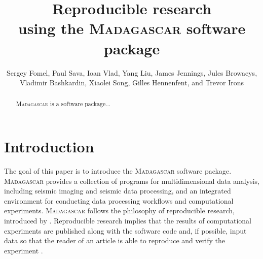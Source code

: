 \title{Reproducible research \\ using the \textsc{Madagascar} software package}

\renewcommand{\thefootnote}{\fnsymbol{footnote}} 

\author{Sergey Fomel\footnotemark[1], Paul Sava\footnotemark[2], Ioan Vlad\footnotemark[3], Yang Liu\footnotemark[1], James Jennings\footnotemark[4], Jules Browaeys\footnotemark[5], Vladimir Bashkardin\footnotemark[1], Xiaolei Song\footnotemark[1], Gilles Hennenfent\footnotemark[6], and Trevor Irons\footnotemark[2]}


\address{
\footnotemark[1]Bureau of Economic Geology, \\
John A. and Katherine G. Jackson School of Geosciences \\ The
University of Texas at Austin \\ University Station, Box X \\ Austin,
TX 78713-8972 \\
\footnotemark[2] Department of Geophysics \\
Colorado School of Mines \\
Golden, CO 80401 \\
\footnotemark[3] Statoil \\
\footnotemark[4] Shell \\
\footnotemark[5] Total \\
\footnotemark[6] Chevron}


\maketitle

\begin{abstract}
  \textsc{Madagascar} is a software package...
\end{abstract}

\section{Introduction}

The goal of this paper is to introduce the \textsc{Madagascar}
software package. \textsc{Madagascar} provides a collection of
programs for multidimensional data analysis, including seismic imaging
and seismic data processing, and an integrated environment for
conducting data processing workflows and computational
experiments. \textsc{Madagascar} follows the philosophy of
reproducible research, introduced by \cite{SEG-1992-0601}.
Reproducible research implies that the results of computational
experiments are published along with the software code and, if
possible, input data so that the reader of an article is able to
reproduce and verify the experiment \cite[]{matt,intro}.

